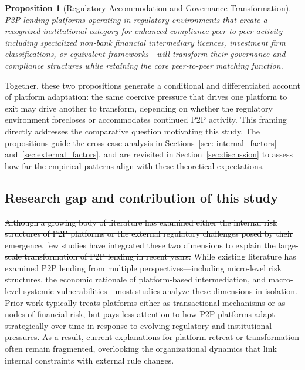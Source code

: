 \documentclass[pdflatex,sn-apa]{sn-jnl}%
\theoremstyle{thmstyleone}%
\newtheorem{proposition}[theorem]{Proposition}%
\theoremstyle{thmstyletwo}%
\theoremstyle{thmstylethree}%
\begin{document}
\begin{proposition}[Regulatory Accommodation and Governance Transformation]
\label{prop2}
\textcolor{NavyBlue}{\textit{P2P lending platforms operating in regulatory environments that create a recognized institutional category for enhanced-compliance peer-to-peer activity---including specialized non-bank financial intermediary licences, investment firm classifications, or equivalent frameworks---will transform their governance and compliance structures while retaining the core peer-to-peer matching function.}}
\end{proposition}

\textcolor{NavyBlue}{Together, these two propositions generate a conditional and differentiated account of platform adaptation: the same coercive pressure that drives one platform to exit may drive another to transform, depending on whether the regulatory environment forecloses or accommodates continued P2P activity. This framing directly addresses the comparative question motivating this study. The propositions guide the cross-case analysis in Sections~\ref{sec: internal_factors} and~\ref{sec:external_factors}, and are revisited in Section~\ref{sec:discussion} to assess how far the empirical patterns align with these theoretical expectations.}

\subsection{Research gap and contribution of this study}

\sout{Although a growing body of literature has examined either the internal risk structures of P2P platforms or the external regulatory challenges posed by their emergence, few studies have integrated these two dimensions to explain the large-scale transformation of P2P lending in recent years.} \textcolor{NavyBlue}{While existing literature has examined P2P lending from multiple perspectives—including micro-level risk structures, the economic rationale of platform-based intermediation, and macro-level systemic vulnerabilities—most studies analyze these dimensions in isolation. Prior work typically treats platforms either as transactional mechanisms or as nodes of financial risk, but pays less attention to how P2P platforms adapt strategically over time in response to evolving regulatory and institutional pressures. As a result, current explanations for platform retreat or transformation often remain fragmented, overlooking the organizational dynamics that link internal constraints with external rule changes.}
\end{document}

